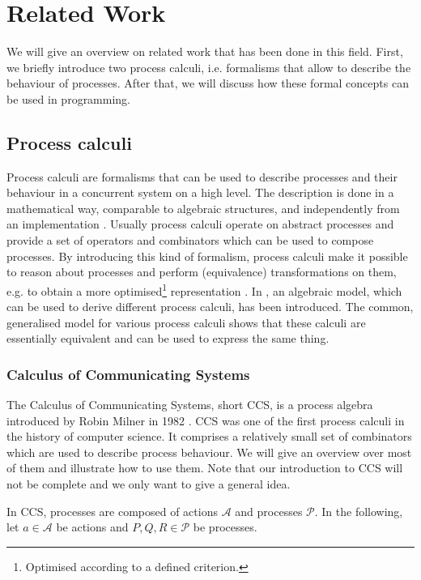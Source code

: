\chapter{Related Work}
We will give an overview on related work that has been done in this field. First, we briefly introduce two process calculi, i.e. formalisms that allow to describe the behaviour of processes. After that, we will discuss how these formal concepts can be used in programming.

\section{Process calculi}
Process calculi are formalisms that can be used to describe processes and their behaviour in a concurrent system on a high level. The description is done in a mathematical way, comparable to algebraic structures, and independently from an implementation \cite{}. Usually process calculi operate on abstract processes and provide a set of operators and combinators which can be used to compose processes. By introducing this kind of formalism, process calculi make it possible to reason about processes and perform (equivalence) transformations on them, e.g. to obtain a more optimised\footnote{Optimised according to a defined criterion.} representation \cite{}. In \cite{Hoare:2012:LPU:2368298.2368301}, an algebraic model, which can be used to derive different process calculi, has been introduced. The common, generalised model for various process calculi shows that these calculi are essentially equivalent and can be used to express the same thing.

\subsection{Calculus of Communicating Systems}
The Calculus of Communicating Systems, short \textsc{CCS}, is a process algebra introduced by Robin Milner in 1982 \cite{Milner:1982:CCS:539036}. \textsc{CCS} was one of the first process calculi in the history of computer science. It comprises a relatively small set of combinators which are used to describe process behaviour. We will give an overview over most of them and illustrate how to use them. Note that our introduction to \textsc{CCS} will not be complete and we only want to give a general idea.

In \textsc{CCS}, processes are composed of actions $\mathcal{A}$ and processes $\mathcal{P}$. In the following, let $a \in \mathcal{A}$ be actions and $P, Q, R \in \mathcal{P}$ be processes.

